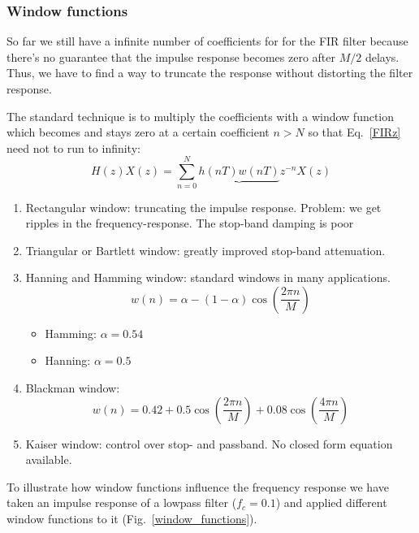 \documentclass[12pt,a4paper]{article}
\begin{document}
\subsubsection{Window functions}
So far we still have a infinite number of coefficients for 
for the FIR filter because there's no guarantee that the 
impulse response becomes zero
after $M/2$ delays. Thus, we have to find a way to truncate the
response without distorting the filter response.

The standard technique is to multiply the coefficients with a window
function which becomes and stays zero at a certain coefficient
$n>N$ so that Eq.~\ref{FIRz} need not to run to infinity:
\begin{equation}
\label{FIRzlimit}
H(z)X(z)=\sum_{n=0}^N \underbrace{h(nT) w(nT)} z^{-n} X(z)
\end{equation}

\begin{enumerate}
\item Rectangular window: truncating the impulse response.
Problem: we get ripples in the frequency-response.
The stop-band damping is poor

\item Triangular or Bartlett window: greatly improved stop-band attenuation.
\item Hanning and Hamming window: standard windows in many applications.
\begin{equation}
w(n) = \alpha - (1-\alpha) \cos\left(\frac{2\pi n}{M}\right)
\end{equation}
\begin{itemize}
\item Hamming: $\alpha = 0.54$
\item Hanning: $\alpha = 0.5$
\end{itemize}

\item Blackman window:
\begin{equation}
w(n) = 0.42 + 0.5 \cos \left(\frac{2 \pi n}{M}\right) + 
0.08 \cos \left( \frac{4 \pi n}{M} \right) 
\end{equation}
\item Kaiser window: control over stop- and passband. No closed form
equation available.
\end{enumerate}
To illustrate how window functions influence the frequency response
we have taken an impulse response of a lowpass filter ($f_c=0.1$)
and applied different window functions to it (Fig.~\ref{window_functions}).
\end{document}
